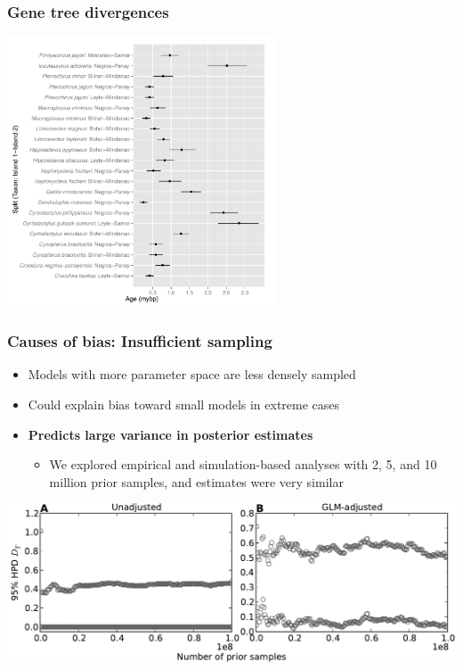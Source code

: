 
\begin{frame}[noframenumbering]
    \frametitle{Gene tree divergences}
    \centerline{
    \includegraphics[height=8cm]{../images/gene_splits.pdf}}
\end{frame}

\begin{frame}[noframenumbering]
    \frametitle{Causes of bias: Insufficient sampling}
    \begin{itemize}
        \item Models with more parameter space are less densely sampled
        \item Could explain bias toward small models in extreme cases
        \item {\bf Predicts large variance in posterior estimates}
        \begin{itemize}
            \item We explored empirical and simulation-based analyses with
                2, 5, and 10 million prior samples, and estimates were
                very similar
        \end{itemize}
    \end{itemize}
    \smallskip
    \centerline{
    \includegraphics[width=\textwidth]{../images/omega_over_sampling.pdf}}
\end{frame}

